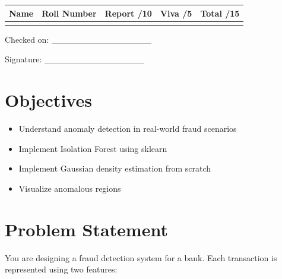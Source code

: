 \documentclass[12pt,a4paper]{article}
\begin{document}
\renewcommand{\arraystretch}{2.0}
\begin{tabularx}{\textwidth}{|Y|Y|Y|Y|Y|}
\hline
\textbf{Name} & \textbf{Roll Number} & \textbf{Report /10} & \textbf{Viva /5} & \textbf{Total /15} \\
\hline
 & & & & \\
\hline
\end{tabularx}
\renewcommand{\arraystretch}{1.0}

\vspace{12pt}

\begin{flushright}
Checked on: \_\_\_\_\_\_\_\_\_\_\_\_\_\_\_\_

\vspace{6pt}

Signature: \_\_\_\_\_\_\_\_\_\_\_\_\_\_\_\_
\end{flushright}

\newpage


\section*{Objectives}

\begin{itemize}
\item Understand anomaly detection in real-world fraud scenarios
\item Implement Isolation Forest using sklearn
\item Implement Gaussian density estimation from scratch
\item Visualize anomalous regions
\end{itemize}


\section*{Problem Statement}

You are designing a fraud detection system for a bank. Each transaction is represented using two features:
\end{document}
